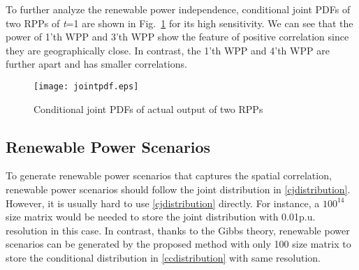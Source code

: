 To further analyze the renewable power independence, conditional joint PDFs of two RPPs of {\it t}=1 are shown in Fig.~\ref{jointpdf} for its high sensitivity. We can see that the power of 1'th WPP and 3'th WPP show the feature of positive correlation since they are geographically close. In contrast, the 1'th WPP and 4'th WPP are further apart and has smaller correlations.
\begin{figure}[ht]
	\begin{center}
		\texttt{[image: jointpdf.eps]}\\
		\caption{Conditional joint PDFs of actual output of two RPPs}\label{jointpdf}
	\end{center}
\end{figure}

\vspace{-1em}

\subsection {Renewable Power Scenarios}
To generate renewable power scenarios that captures the spatial correlation, renewable power scenarios should follow the joint distribution in \eqref{cjdistribution}. However, it is usually hard to use \eqref{cjdistribution} directly. For instance, a $100^{14}$ size matrix would be needed to store the joint distribution with 0.01p.u. resolution in this case. In contrast, thanks to the Gibbs theory, renewable power scenarios can be generated by the proposed method with only 100 size matrix to store the conditional distribution in \eqref{ccdistribution} with same resolution.


